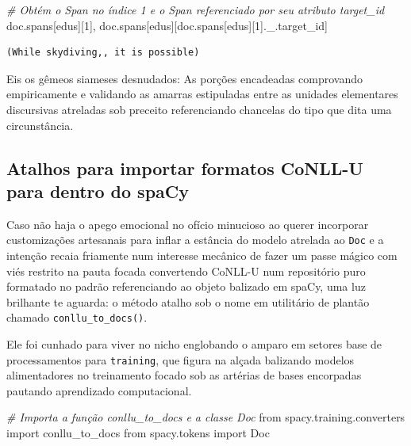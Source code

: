 \documentclass[
  brazilian,
]{article}
\newenvironment{Shaded}{}{}
\newcommand{\CommentTok}[1]{\textcolor[rgb]{0.38,0.63,0.69}{\textit{#1}}}
\newcommand{\DecValTok}[1]{\textcolor[rgb]{0.25,0.63,0.44}{#1}}
\newcommand{\ImportTok}[1]{#1}
\newcommand{\NormalTok}[1]{#1}
\newcommand{\StringTok}[1]{\textcolor[rgb]{0.25,0.44,0.63}{#1}}
\begin{document}
\begin{Shaded}
\begin{Highlighting}[]
\CommentTok{\# Obtém o Span no índice 1 e o Span referenciado por seu atributo \textquotesingle{}target\_id\textquotesingle{}}
\NormalTok{doc.spans[}\StringTok{\textquotesingle{}edus\textquotesingle{}}\NormalTok{][}\DecValTok{1}\NormalTok{], doc.spans[}\StringTok{\textquotesingle{}edus\textquotesingle{}}\NormalTok{][doc.spans[}\StringTok{\textquotesingle{}edus\textquotesingle{}}\NormalTok{][}\DecValTok{1}\NormalTok{].\_.target\_id]}
\end{Highlighting}
\end{Shaded}

\begin{verbatim}
(While skydiving,, it is possible)
\end{verbatim}

Eis os gêmeos siameses desnudados: As porções encadeadas comprovando
empiricamente e validando as amarras estipuladas entre as unidades
elementares discursivas atreladas sob preceito referenciando chancelas
do tipo que dita uma circunstância.

\hypertarget{atalhos-para-importar-formatos-conll-u-para-dentro-do-spacy}{%
\subsection{Atalhos para importar formatos CoNLL-U para dentro do
spaCy}\label{atalhos-para-importar-formatos-conll-u-para-dentro-do-spacy}}

Caso não haja o apego emocional no ofício minucioso ao querer incorporar
customizações artesanais para inflar a estância do modelo atrelada ao
\texttt{Doc} e a intenção recaia friamente num interesse mecânico de
fazer um passe mágico com viés restrito na pauta focada convertendo
CoNLL-U num repositório puro formatado no padrão referenciando ao objeto
balizado em spaCy, uma luz brilhante te aguarda: o método atalho sob o
nome em utilitário de plantão chamado \texttt{conllu\_to\_docs()}.

Ele foi cunhado para viver no nicho englobando o amparo em setores base
de processamentos para \texttt{training}, que figura na alçada balizando
modelos alimentadores no treinamento focado sob as artérias de bases
encorpadas pautando aprendizado computacional.

\begin{Shaded}
\begin{Highlighting}[]
\CommentTok{\# Importa a função \textquotesingle{}conllu\_to\_docs\textquotesingle{} e a classe Doc}
\ImportTok{from}\NormalTok{ spacy.training.converters }\ImportTok{import}\NormalTok{ conllu\_to\_docs}
\ImportTok{from}\NormalTok{ spacy.tokens }\ImportTok{import}\NormalTok{ Doc}
\end{Highlighting}
\end{Shaded}
\end{document}
